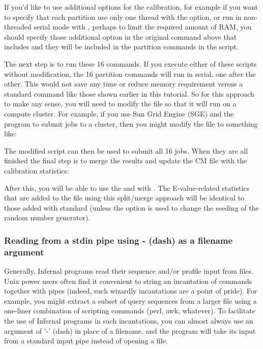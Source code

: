 If you'd like to use additional options for the calibration, for
example if you want to specify that each partition use only one thread
with the  option, or run in non-threaded serial mode
with , perhaps to limit the required amount of RAM, you
should specify those additional option in the original command above
that includes  and they will be included in the
partition commands in the  script.

The next step is to run these 16 commands. If you execute either of
these scripts without modification, the 16 partition commands will run
in serial, one after the other. This would not save any time or reduce
memory requirement versus a standard  command like
those shown earlier in this tutorial. So for this approach to make any
sense, you will need to modify the  file so that
it will run on a compute cluster. For example, if you use Sun Grid
Engine (SGE) and the program  to submit jobs to a cluster,
then you might modify the  file to something
like:


The modified script can then be used to submit all 16 jobs. When they
are all finished the final step is to merge the results and update the
CM file with the calibration statistics:


After this, you will be able to use the  and
 with . The E-value-related statistics
that are added to the \prog{Cobalamin.cm} file using this split/merge
approach will be identical to those added with standard
 (unless the  option is used to
change the seeding of the random number generator).

\subsubsection{Reading from a stdin pipe using - (dash) as a filename argument}

Generally, Infernal programs read their sequence and/or profile input
from files. Unix power users often find it convenient to string an
incantation of commands together with pipes (indeed, such wizardly
incantations are a point of pride). For example, you might extract a
subset of query sequences from a larger file using a one-liner
combination of scripting commands (perl, awk, whatever). To facilitate
the use of Infernal programs in such incantations, you can almost
always use an argument of '-' (dash) in place of a filename, and the
program will take its input from a standard input pipe instead of
opening a file.

